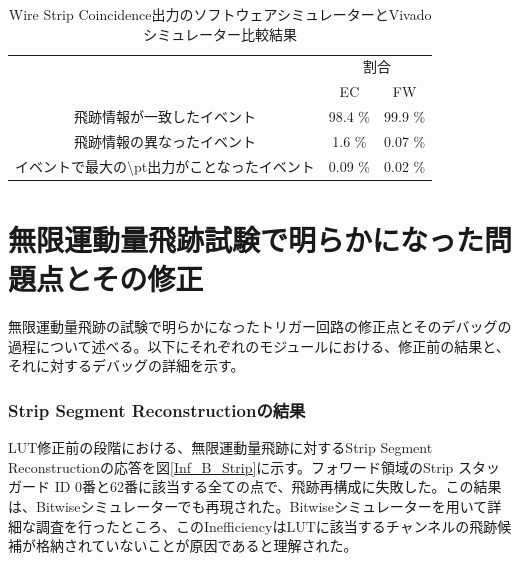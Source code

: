 \begin{table}[]
    \centering
    \caption{Wire Strip Coincidence出力のソフトウェアシミュレーターとVivadoシミュレーター比較結果}
    \label{tab:Vivado_WS}
    \begin{tabular}{|c|cc|}
    \hline
    \multirow{2}{*}{}                      & \multicolumn{2}{c|}{割合}                \\ \cline{2-3} 
                                           & \multicolumn{1}{c|}{EC}      & FW      \\ \hline\hline
    飛跡情報が一致したイベント                          & \multicolumn{1}{c|}{98.4 \%} & 99.9 \% \\ \hline
    飛跡情報の異なったイベント                          & \multicolumn{1}{c|}{1.6 \%}  & 0.07 \% \\ \hline
    イベントで最大の\textbackslash{}pt出力がことなったイベント & \multicolumn{1}{c|}{0.09 \%} & 0.02 \% \\ \hline
    \end{tabular}
\end{table}



\clearpage


\section{無限運動量飛跡試験で明らかになった問題点とその修正}
\label{sec:appendix:infinite-momentum-tracks}
無限運動量飛跡の試験で明らかになったトリガー回路の修正点とそのデバッグの過程について述べる。以下にそれぞれのモジュールにおける、修正前の結果と、それに対するデバッグの詳細を示す。


\subsubsection{Strip Segment Reconstructionの結果}
LUT修正前の段階における、無限運動量飛跡に対するStrip Segment Reconstructionの応答を図\ref{Inf_B_Strip}に示す。フォワード領域のStrip スタッガード ID 0番と62番に該当する全ての点で、飛跡再構成に失敗した。この結果は、Bitwiseシミュレーターでも再現された。Bitwiseシミュレーターを用いて詳細な調査を行ったところ、このInefficiencyはLUTに該当するチャンネルの飛跡候補が格納されていないことが原因であると理解された。

